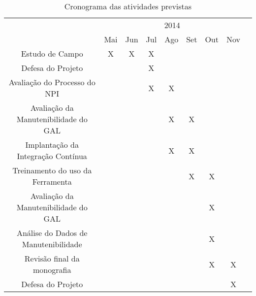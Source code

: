\begin{table}[!htpb]
\centering
\caption{Cronograma das atividades previstas}

\begin{small} 
  
\setlength{\tabcolsep}{6pt} 


\begin{tabular}{|c|c|c|c|c|c|c|c|c}\hline
 & \multicolumn{7}{c|}{2014}\\ \cline{2-8}
\raisebox{1.5ex}{ATIVIDADES} & Mai & Jun & Jul & Ago & Set & Out & Nov \\ \hline

Estudo de Campo & X & X & X & &  &  & \\ \hline
Defesa do Projeto &  &  & X & &  &  & \\ \hline
Avaliação do Processo do NPI &  &  & X & X &  &  & \\ \hline
Avaliação da Manutenibilidade do GAL &  &  &  & X & X &  & \\ \hline
Implantação da Integração Contínua &  &  &  & X & X &  & \\ \hline
Treinamento do uso da Ferramenta &  &  &  & & X & X & \\ \hline
Avaliação da Manutenibilidade do GAL  &  &  &  &  &  & X & \\ \hline
Análise do Dados de Manutenibilidade &  &  &  & &  & X &  \\ \hline
Revisão final da monografia & & & & & & X & X \\ \hline
Defesa do Projeto & & & & & & & X \\ \hline

\end{tabular} 
\end{small}
\label{t_cronograma}
\end{table} 